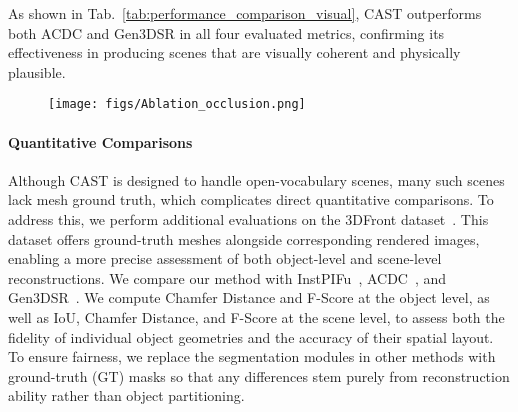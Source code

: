 As shown in Tab.~\ref{tab:performance_comparison_visual}, CAST outperforms both ACDC and Gen3DSR in all four evaluated metrics, confirming its effectiveness in producing scenes that are visually coherent and physically plausible.

\begin{figure} []
  \centering
  \texttt{[image: figs/Ablation\_occlusion.png]}
  \label{Ablation_occlusion}
\end{figure}

\paragraph{Quantitative Comparisons}

% 
Although CAST is designed to handle open-vocabulary scenes, many such scenes lack mesh ground truth, which complicates direct quantitative comparisons. To address this, we perform additional evaluations on the 3DFront dataset~\cite{fu20213d}. This dataset offers ground-truth meshes alongside corresponding rendered images, enabling a more precise assessment of both object-level and scene-level reconstructions.
% 
We compare our method with InstPIFu~\cite{liu2022towards}, ACDC~\cite{dai2024automated}, and Gen3DSR~\cite{dogaru2024generalizable}.
% 
We compute Chamfer Distance and F-Score at the object level, as well as IoU, Chamfer Distance, and F-Score at the scene level, to assess both the fidelity of individual object geometries and the accuracy of their spatial layout.
% 
To ensure fairness, we replace the segmentation modules in other methods with ground-truth (GT) masks so that any differences stem purely from reconstruction ability rather than object partitioning.


